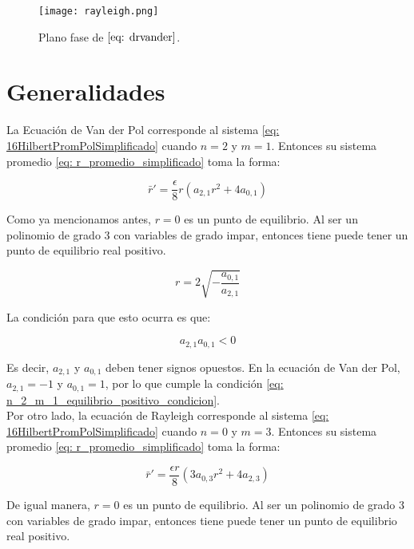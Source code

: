 \begin{figure}[h]
	\centering
	\texttt{[image: rayleigh.png]}
	\caption{Plano fase de $\eqref{eq: drvander}$.}
\end{figure}

\newpage

\section{Generalidades}

La Ecuación de Van der Pol corresponde al sistema \eqref{eq: 16HilbertPromPolSimplificado} cuando $n=2$ y $m=1$. Entonces su sistema promedio \eqref{eq: r_promedio_simplificado} toma la forma:

\begin{equation}\label{eq: n_2_m_1}
	\bar{r}'=\frac{\epsilon}{8}r\left(a_{2,1}r^2+4a_{0,1}\right)
\end{equation}

Como ya mencionamos antes, $r=0$ es un punto de equilibrio. Al ser un polinomio de grado 3 con variables de grado impar, entonces tiene puede tener un punto de equilibrio real positivo. 

\begin{equation}\label{eq: n_2_m_1_equilibrio_positivo}
	r=2\sqrt{-\frac{a_{0,1}}{a_{2,1}}}
\end{equation}

La condición para que esto ocurra es que:

\begin{equation}\label{eq: n_2_m_1_equilibrio_positivo_condicion}
	a_{2,1}a_{0,1}<0
\end{equation}

Es decir, $a_{2,1}$ y $a_{0,1}$ deben tener signos opuestos. En la ecuación de Van der Pol, $a_{2,1}=-1$ y $a_{0,1}=1$, por lo que cumple la condición \eqref{eq: n_2_m_1_equilibrio_positivo_condicion}.\\

Por otro lado, la ecuación de Rayleigh corresponde al sistema \eqref{eq: 16HilbertPromPolSimplificado} cuando $n=0$ y $m=3$. Entonces su sistema promedio \eqref{eq: r_promedio_simplificado} toma la forma:

\begin{equation}\label{eq: n_0_m_3}
	\bar{r}'=\frac{\epsilon r}{8}\left(3a_{0,3}r^2+4a_{2,3}\right)
\end{equation}

De igual manera, $r=0$ es un punto de equilibrio. Al ser un polinomio de grado 3 con variables de grado impar, entonces tiene puede tener un punto de equilibrio real positivo. 

